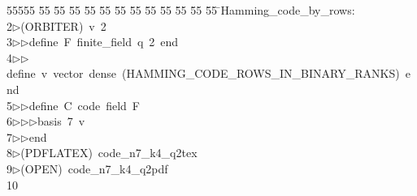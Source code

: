 %
%
\begin{tabbing}
55555 \= 55 \= 55 \= 55 \= 55 \= 55 \= 55 \= 55 \= 55 \= 55 \= 55 \= 55 \= 55 \= \>Hamming\_code\_by\_rows:\\[0pt]
2\>$\triangleright$\>(ORBITER)\ v\ 2\ \\[0pt]
3\>$\triangleright$\>$\triangleright$\>define\ F\ finite\_field\ q\ 2\ end\ \\[0pt]
4\>$\triangleright$\>$\triangleright$\>define\ v\ vector\ dense\ (HAMMING\_CODE\_ROWS\_IN\_BINARY\_RANKS)\ end\ \\[0pt]
5\>$\triangleright$\>$\triangleright$\>define\ C\ code\ field\ F\ \\[0pt]
6\>$\triangleright$\>$\triangleright$\>$\triangleright$\>basis\ 7\ v\ \\[0pt]
7\>$\triangleright$\>$\triangleright$\>end\\[0pt]
8\>$\triangleright$\>(PDFLATEX)\ code\_n7\_k4\_q2tex\\[0pt]
9\>$\triangleright$\>(OPEN)\ code\_n7\_k4\_q2pdf\\[0pt]
10\>\end{tabbing}
